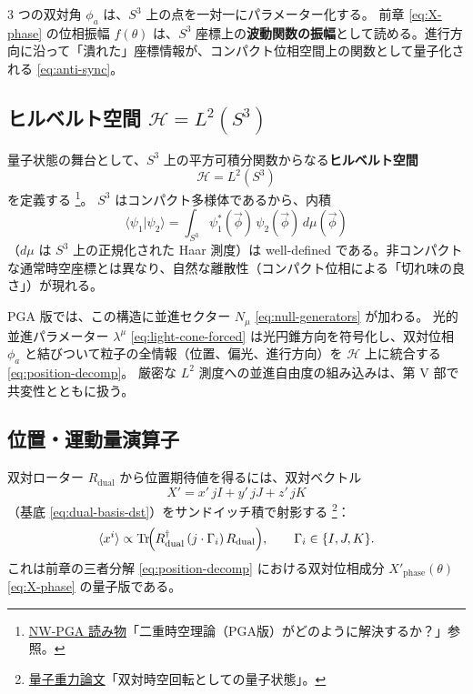 \documentclass[dvipdfmx,a4paper,oneside]{jsbook}
\numberwithin{equation}{chapter}
\begin{document}
3 つの双対角 \(\phi_a\) は、\(S^3\) 上の点を一対一にパラメーター化する。
前章 \eqref{eq:X-phase} の位相振幅 \(f(\theta)\) は、\(S^3\) 座標上の\textbf{波動関数の振幅}として読める。進行方向に沿って「潰れた」座標情報が、コンパクト位相空間上の関数として量子化される \eqref{eq:anti-sync}。

\subsection{ヒルベルト空間 \(\mathcal{H} = L^2(S^3)\)}

量子状態の舞台として、\(S^3\) 上の平方可積分関数からなる\textbf{ヒルベルト空間}
\begin{equation}
  \mathcal{H} = L^2(S^3)
  \label{eq:hilbert-s3}
\end{equation}
を定義する \footnote{\hyperref[sec:sister-manuscripts]{NW-PGA 読み物}「二重時空理論（PGA版）がどのように解決するか？」参照。}。
\(S^3\) はコンパクト多様体であるから、内積
\begin{equation}
  \langle \psi_1 | \psi_2 \rangle
  = \int_{S^3} \psi_1^*(\vec\phi)\,\psi_2(\vec\phi)\, d\mu(\vec\phi)
  \label{eq:s3-inner-product}
\end{equation}
（\(d\mu\) は \(S^3\) 上の正規化された Haar 測度）は well-defined である。非コンパクトな通常時空座標とは異なり、自然な離散性（コンパクト位相による「切れ味の良さ」）が現れる。

PGA 版では、この構造に並進セクター \(N_\mu\) \eqref{eq:null-generators} が加わる。
光的並進パラメーター \(\lambda^\mu\) \eqref{eq:light-cone-forced} は光円錐方向を符号化し、双対位相 \(\phi_a\) と結びついて粒子の全情報（位置、偏光、進行方向）を \(\mathcal{H}\) 上に統合する \eqref{eq:position-decomp}。
厳密な \(L^2\) 測度への並進自由度の組み込みは、第 V 部で共変性とともに扱う。

\subsection{位置・運動量演算子}

双対ローター \(R_{\mathrm{dual}}\) から位置期待値を得るには、双対ベクトル
\begin{equation}
  X' = x'\, jI + y'\, jJ + z'\, jK
  \label{eq:dual-vector-position}
\end{equation}
（基底 \eqref{eq:dual-basis-dst}）をサンドイッチ積で射影する \footnote{\hyperref[sec:sister-manuscripts]{量子重力論文}「双対時空回転としての量子状態」。}：
\begin{equation}
  \langle x^i \rangle
  \propto \operatorname{Tr}\!\Bigl(
    R_{\mathrm{dual}}^\dagger\,(j \cdot \Gamma_i)\,R_{\mathrm{dual}}
  \Bigr),
  \qquad \Gamma_i \in \{I, J, K\}.
  \label{eq:position-expectation}
\end{equation}
これは前章の三者分解 \eqref{eq:position-decomp} における双対位相成分 \(X'_{\mathrm{phase}}(\theta)\) \eqref{eq:X-phase} の量子版である。
\end{document}
